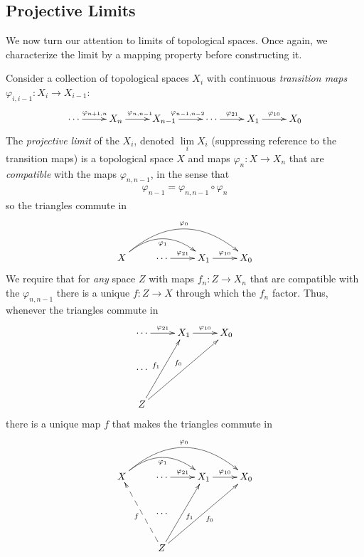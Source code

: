       \subsection{Projective Limits}
        We now turn our attention to limits of topological spaces.
        Once again, we characterize the limit by a mapping property before constructing it.
        \begin{defn}
          Consider a collection of topological spaces $X_i$ with continuous \emph{transition maps} $\varphi_{i,i-1}:X_i\rightarrow X_{i-1}$:
          \begin{displaymath}
            \xymatrix{
              \cdots \ar[r]^{\varphi_{n+1,n}} & X_n \ar[r]^{\varphi_{n,n-1}} & X_{n-1} \ar[r]^{\varphi_{n-1,n-2}} & \cdots \ar[r]^{\varphi_{21}} & X_1 \ar[r]^{\varphi_{10}} & X_0
            }
          \end{displaymath}
          The \emph{projective limit} of the $X_i$, denoted $\lim\limits_i X_i$ (suppressing reference to the transition maps) is a topological space $X$ and maps $\varphi_n:X\rightarrow X_n$ that are \emph{compatible} with the maps $\varphi_{n,n-1}$, in the sense that 
          \begin{align*}
            \varphi_{n-1}=\varphi_{n,n-1}\circ\varphi_n
          \end{align*}
          so the triangles commute in
          \begin{displaymath}
            \xymatrix{
              X \ar@/^20pt/[rr]_{\varphi_1} \ar@/^30pt/[rrr]^{\varphi_0}
              & \cdots \ar[r]^{\varphi_{21}}
              & X_1 \ar[r]^{\varphi_{10}}
              & X_0
            }
          \end{displaymath}
          We require that for \emph{any} space $Z$ with maps $f_n:Z\rightarrow X_n$ that are compatible with the $\varphi_{n,n-1}$ there is a unique $f:Z\rightarrow X$ through which the $f_n$ factor.
          Thus, whenever the triangles commute in
          \begin{displaymath}
            \xymatrix{
               \cdots \ar[r]^{\varphi_{21}}
              & X_1 \ar[r]^{\varphi_{10}}
              & X_0
              \\ \cdots \\
              Z \ar[uur]^{f_1} \ar[uurr]^{f_0}
            }
          \end{displaymath}
          there is a unique map $f$ that makes the triangles commute in
          \begin{displaymath}
            \xymatrix{
              X \ar@/^20pt/[rr]_{\varphi_1} \ar@/^30pt/[rrr]^{\varphi_0}
              & \cdots \ar[r]^{\varphi_{21}}
              & X_1 \ar[r]^{\varphi_{10}}
              & X_0
              \\ & \cdots \\
              & Z \ar@{-->}[uul]^f \ar[uur]_{f_1} \ar[uurr]_{f_0}
            }
          \end{displaymath}
        \end{defn}
